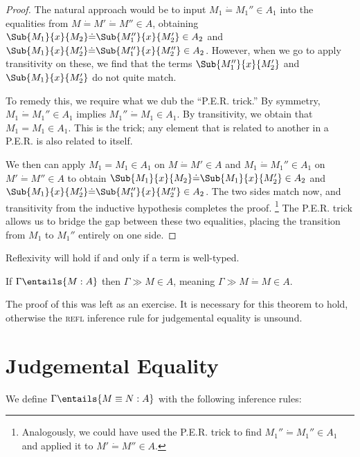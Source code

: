 \documentclass[letterpaper]{article}
\begin{document}
\begin{proof}
The natural approach would be to input $M_1 \dot{=} M_1'' \in A_1$ into the equalities from $M \dot{=} M' \dot{=} M'' \in A$, obtaining 
$\Sub{M_1}{x}{M_2} \dot{=} \Sub{M_1''}{x}{M_2'} \in A_2$ and $\Sub{M_1}{x}{M_2'} \dot{=} \Sub{M_1''}{x}{M_2''} \in A_2$. However, when we go to apply
transitivity on these, we find that the terms $\Sub{M_1''}{x}{M_2'}$ and $\Sub{M_1}{x}{M_2'}$ do not quite match. 

To remedy this, we require what we dub the ``P.E.R. trick.'' By symmetry, $M_1 \dot{=} M_1'' \in A_1$ implies $M_1'' \dot{=} M_1 \in A_1$.
By transitivity, we obtain that $M_1 = M_1 \in A_1$. This is the trick; any element that is related to another in a P.E.R. is also related to itself.

We then can apply $M_1 = M_1 \in A_1$ on $M \dot{=} M' \in A$ and $M_1 \dot{=} M_1'' \in A_1$ on $M' \dot{=} M'' \in A$ to obtain
$\Sub{M_1}{x}{M_2} \dot{=} \Sub{M_1}{x}{M_2'} \in A_2$ and $\Sub{M_1}{x}{M_2'} \dot{=} \Sub{M_1''}{x}{M_2''} \in A_2$. The two sides match now, 
and transitivity from the inductive hypothesis completes the proof.
\footnote{Analogously, we could have used the P.E.R. trick to find $M_1'' \dot{=} M_1'' \in A_1$ and applied it to $M' \dot{=} M'' \in A$.}
The P.E.R. trick allows us to bridge the gap between these two equalities, placing the transition from $M_1$ to $M_1''$ entirely on one side.  

\end{proof}

Reflexivity will hold if and only if a term is well-typed.

\begin{theorem}[Reflexivity]
    If $\Gamma \entails{M : A}$ then $\Gamma \gg M \in A$, meaning $\Gamma \gg M \dot{=} M \in A$.
\end{theorem}
The proof of this was left as an exercise. It is necessary for this theorem to hold, otherwise the \textsc{refl} inference rule for judgemental equality is unsound.

\section{Judgemental Equality}

We define $\Gamma \entails{M \equiv N : A}$ with the following inference rules:

\begin{mathpar}

\end{mathpar}
\end{document}
